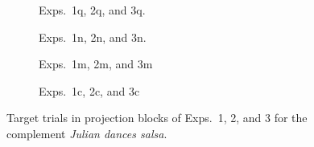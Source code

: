 \documentclass[11pt,fleqn]{article}
\newcommand{\6}{\mbox{$[\hspace*{-.6mm}[$}}
\newcommand{\9}{\mbox{$]\hspace*{-.6mm}]$}}
\begin{document}
\begin{figure}[h!]
\centering

\begin{subfigure}[t]{0.5\textwidth}
        \centering
{}
\caption{Exps.~1q, 2q, and 3q.}\label{fig-exp1q-projection}
\end{subfigure}%
\begin{subfigure}[t]{0.5\textwidth}
\centering
{} 
\caption{Exps.~1n, 2n, and 3n.}\label{fig-exp1n-projection}
 \end{subfigure}
\begin{subfigure}[t]{0.5\textwidth}
        \centering
{}
\caption{Exps.~1m, 2m, and 3m}\label{fig-exp1m-projection}
 \end{subfigure}%
\begin{subfigure}[t]{0.5\textwidth}
\centering
{} 
\caption{Exps.~1c, 2c, and 3c}\label{fig-exp1c-projection}
\end{subfigure}
\caption{Target trials in projection blocks of Exps.~1, 2, and 3 for the complement {\em Julian dances salsa}.}\label{fig:projection-trials}
\end{figure}
\end{document}
